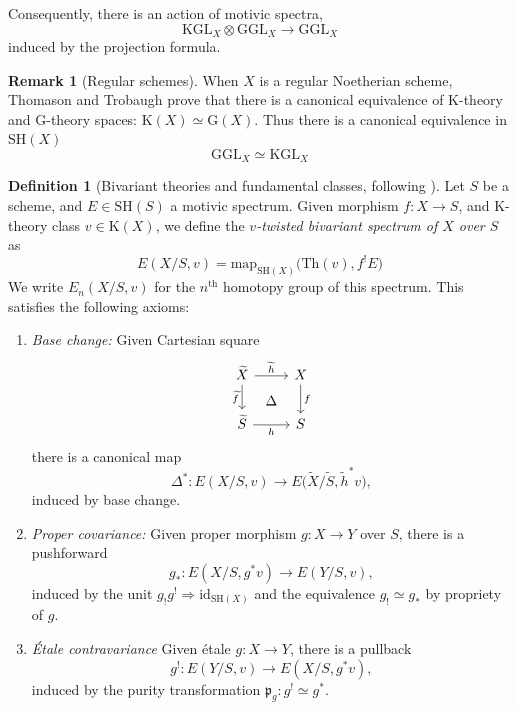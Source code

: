 \documentclass[11pt, twoside]{article}
\numberwithin{equation}{section}
\theoremstyle{definition}
\newtheorem{definition}[equation]{Definition}
\newtheorem{remark}[equation]{Remark}
\newcommand{\id}{\mathrm{id} }
\newcommand{\mf}[1]{\mathfrak{#1}}
\newcommand{\map}{\mathrm{map}}
\newcommand{\Kgl}{\mathrm{KGL}}
\newcommand{\Ggl}{\mathrm{GGL}}
\newcommand{\sh}{\mathrm{SH}}
\newcommand{\G}{\mathrm{G}}
\newcommand{\K}{\mathrm{K}}
\begin{document}
Consequently, there is an action of motivic spectra, 
\[\Kgl_X \otimes \Ggl_X \to \Ggl_X\]
induced by the projection formula.

\begin{remark}[Regular schemes] When \(X\) is a regular Noetherian scheme, Thomason and Trobaugh \cite{TT} prove that there is a canonical equivalence of K-theory and G-theory spaces: \(\K(X) \simeq \G(X)\). Thus there is a canonical equivalence in \(\sh(X)\)
\begin{equation}\label{eq:G-reg}
\Ggl_X \simeq \Kgl_X
\end{equation}
\end{remark}

\begin{definition}[Bivariant theories and fundamental classes, following \cite{DJK}]
Let \(S\) be a scheme, and \(E \in \sh(S)\) a motivic spectrum. Given morphism \(f \colon X \to S\), and K-theory class \(v \in \K(X)\), we define the \emph{\(v\)-twisted bivariant spectrum of \(X\) over \(S\)} as 
\[E(X/S, v) = \map_{\sh(X)}\big(\mathrm{Th}(v), f^!E\big)\]
We write \(E_n(X/S, v)\) for the \(n^\mathrm{th}\) homotopy group of this spectrum. 
This satisfies the following axioms: 
\begin{enumerate}

\item \emph{Base change:} Given Cartesian square 
\begin{equation}\label{eq:cart-sq}
\begin{tikzcd}
\tilde{X} \ar[d, "\tilde{f}", swap] \ar[r, "\tilde{h}", ""{name=h1}] & X \ar[d, "f"]\\
\tilde{S} \ar[r, "h", swap, ""{name=h2}] & S 
\ar[phantom, from=h1, to=h2, "\Delta"]
\end{tikzcd}
\end{equation}
there is a canonical map 
\[\Delta^* \colon E(X/S, v) \to E\big(\tilde{X}/\tilde{S}, \tilde{h}^*v\big),\]
induced by base change.

\item \emph{Proper covariance:} Given proper morphism \(g \colon X \to Y\) over \(S\), there is a pushforward 
\[g_* \colon E(X/S, g^*v) \to E(Y/S, v),\]
induced by the unit \(g_! g^! \Longrightarrow \id_{\sh(X)}\) and the equivalence \(g_! \simeq g_*\) by propriety of \(g\).

\item \emph{Étale contravariance} Given étale \(g \colon X \to Y\), there is a pullback 
\[g^! \colon E(Y/S, v) \to E(X/S, g^*v),\]
induced by the purity transformation \(\mf{p}_g \colon g^! \simeq g^*\).


\end{enumerate}
\end{definition}
\end{document}
